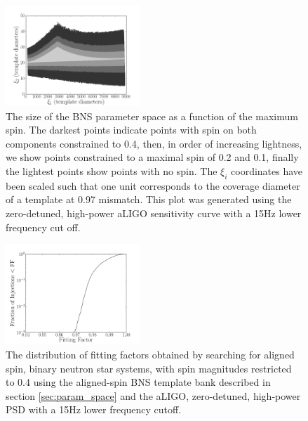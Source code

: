 \begin{figure}
\includegraphics[width=0.45\textwidth]{papers/bns_spin/figure4.png}
\caption{\label{fig:param_space_spin} The size of the BNS parameter space as a function of the maximum spin.
The darkest points indicate points with spin on both components constrained to 0.4, then, in order of
increasing lightness, we show points constrained
to a maximal spin of 0.2 and 0.1, finally the lightest points show points with no spin. 
The $\xi_i$ coordinates have been scaled
such that one unit corresponds to the coverage diameter of a template
at 0.97 mismatch.
This plot was generated
using the zero-detuned, high-power aLIGO sensitivity curve with a 15Hz lower frequency cut off.}
\end{figure}

\begin{figure}
\includegraphics[width=0.45\textwidth]{papers/bns_spin/figure5.pdf}
\caption{\label{fig:anstar-aligned} The distribution of fitting factors obtained by searching
for aligned spin, binary neutron star systems, with spin magnitudes restricted to 0.4
using the aligned-spin BNS template bank described in section \ref{sec:param_space}
and the aLIGO, zero-detuned, high-power PSD with a 15Hz lower frequency cutoff.}
\end{figure}

